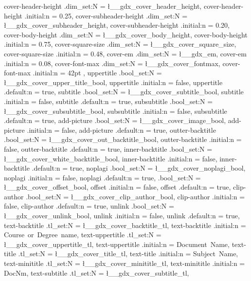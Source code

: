 { 		%
	cover-header-height		.dim_set:N 		=	\l__gdx_cover_header_height,
		cover-header-height 	.initial:n	= 	{ 0.25\textheight },
	cover-subheader-height 	.dim_set:N 		=	\l__gdx_cover_subheader_height,
		cover-subheader-height 	.initial:n 	= 	{ 0.20\textheight },
	cover-body-height 		.dim_set:N 		=	\l__gdx_cover_body_height,
		cover-body-height 		.initial:n 	= 	{ 0.75\textheight },
	cover-square-size 		.dim_set:N 		=	\l__gdx_cover_square_size,
		cover-square-size 		.initial:n 	= 	{ 0.48\textwidth },
	cover-em 				.dim_set:N 		=	\l__gdx_em,
		cover-em 				.initial:n 	=	{ 0.08\textwidth },
	cover-font-max 			.dim_set:N 		= 	\l__gdx_cover_fontmax,
		cover-font-max 			.initial:n 	= 	{ 42pt },
	uppertitle 			.bool_set:N		=	\l__gdx_cover_upper_title_bool,
		uppertitle			.initial:n	=			false,
		uppertitle			.default:n	=			true,
	subtitle 			.bool_set:N		=	\l__gdx_cover_subtitle_bool,
		subtitle			.initial:n	=			false,
		subtitle			.default:n	=			true,
	subsubtitle 		.bool_set:N		=	\l__gdx_cover_subsubtitle_bool,
		subsubtitle 		.initial:n	=			false,
		subsubtitle 		.default:n	=			true,
	add-picture			.bool_set:N		=	\l__gdx_cover_image_bool,
		add-picture			.initial:n	=			false,
		add-picture			.default:n	=			true,
	outter-backtitle	.bool_set:N		=	\l__gdx_cover_out_backtitle_bool,
		outter-backtitle	.initial:n	=			false,
		outter-backtitle	.default:n	=			true,
	inner-backtitle 	.bool_set:N		=	\l__gdx_cover_white_backtitle_bool,
		inner-backtitle		.initial:n	=			false,
		inner-backtitle		.default:n	=			true,
	noplagi				.bool_set:N		=	\l__gdx_cover_noplagi_bool,
		noplagi				.initial:n	=			false,
		noplagi				.default:n	=			true,
	 				.bool_set:N		=	\l__gdx_cover_offset_bool,
		offset				.initial:n	=			false,
		offset				.default:n	=			true,
	clip-author			.bool_set:N		=	\l__gdx_cover_clip_author_bool,
		clip-author			.initial:n	=			false,
		clip-author			.default:n	=			true,
	unlink				.bool_set:N		=		\l__gdx_cover_unlink_bool,
		unlink				.initial:n	=			false,
		unlink				.default:n	=			true,
	text-backtitle			.tl_set:N		=	\l__gdx_cover_backtitle_tl,
		text-backtitle			.initial:n 	=				{Course~or~Degree~name},
	text-uppertitle 		.tl_set:N		=	\l__gdx_cover_uppertitle_tl,
		text-uppertitle 		.initial:n	=				{Document~Name},
	text-title		 		.tl_set:N		=	\l__gdx_cover_title_tl,
		text-title				.initial:n 	=				{Subject~Name},
	text-minititle			.tl_set:N		=	\l__gdx_cover_minititle_tl,
		text-minititle			.initial:n 	=				{DocNm},
	text-subtitle 			.tl_set:N		=	\l__gdx_cover_subtitle_tl,
}
